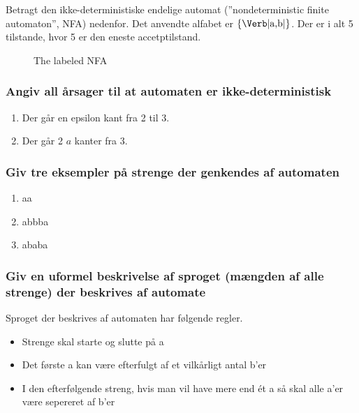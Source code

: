 Betragt den ikke-deterministiske endelige automat (''nondeterministic finite automaton'', NFA) nedenfor. Det anvendte alfabet er $\{\text{\Verb|a,b|}\}$. Der er i alt 5 tilstande, hvor 5 er den eneste accetptilstand.
\begin{figure}[!ht]\label{fig:2018:examfignfa}
  \centering
  \caption{The labeled NFA}
\end{figure}
\subsubsection{Angiv all årsager til at automaten er ikke-deterministisk}
\begin{enumerate}
  \item Der går en epsilon kant fra 2 til 3.
  \item Der går 2 $a$ kanter fra 3.
\end{enumerate}
\subsubsection{Giv tre eksempler på strenge der genkendes af automaten}
\begin{enumerate}
  \item aa
  \item abbba
  \item ababa
\end{enumerate}
\subsubsection{Giv en uformel beskrivelse af sproget (mængden af alle strenge) der beskrives af automate}
Sproget der beskrives af automaten har følgende regler.
\begin{itemize}
  \item Strenge skal starte og slutte på a
  \item Det første a kan være efterfulgt af et vilkårligt antal b'er
  \item I den efterfølgende streng, hvis man vil have mere end ét a så skal alle a'er være sepereret af b'er
\end{itemize}
\newpage
